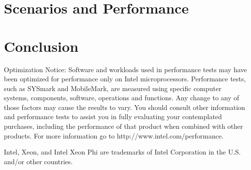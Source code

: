 \section{Scenarios and Performance}
\label{sec:benchmarks}


\section{Conclusion}
\label{sec:conclusion}



{ \scriptsize

\noindent Optimization Notice: Software and workloads used in
performance tests may have been optimized for performance only on
Intel microprocessors.  Performance tests, such as SYSmark and
MobileMark, are measured using specific computer systems,
components, software, operations and functions.  Any change to any
of those factors may cause the results to vary.  You should
consult other information and performance tests to assist you in
fully evaluating your contemplated purchases, including the
performance of that product when combined with other products.
For more information go to http://www.intel.com/performance.

\noindent Intel, Xeon, and Intel Xeon
Phi are trademarks of Intel Corporation in the U.S. and/or other
countries.

}
